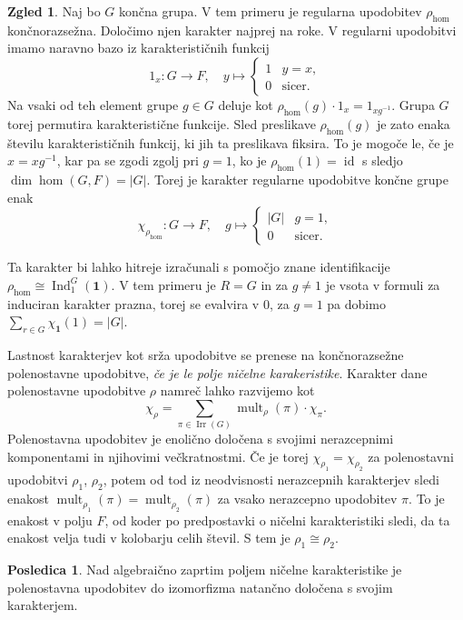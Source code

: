 \documentclass[11pt]{book}
\def\11{\mathbf{1}}
\DeclareMathOperator\Ind{Ind}
\DeclareMathOperator\mult{mult}
\DeclareMathOperator\Irr{Irr}
\DeclareMathOperator\id{id}
\theoremstyle{definition}
\theoremstyle{zgled}
\newtheorem*{zgled}{Zgled}
\theoremstyle{odprtproblem}
\theoremstyle{domacanaloga}
\theoremstyle{izrek}
\newtheorem*{posledica}{Posledica}
\begin{document}
\begin{zgled}
    Naj bo $G$ končna grupa. V tem primeru je regularna upodobitev $\rho_{\hom}$ končnorazsežna. Določimo njen karakter najprej na roke. V regularni upodobitvi imamo naravno bazo iz karakterističnih funkcij
    \[
        1_{x} \colon G \to F, \quad
        y \mapsto \begin{cases} 1 & y = x, \\ 0 & \text{sicer.} \end{cases}
    \]
    Na vsaki od teh element grupe $g \in G$ deluje kot $\rho_{\hom}(g) \cdot 1_x = 1_{x g^{-1}}$. Grupa $G$ torej permutira karakteristične funkcije. Sled preslikave $\rho_{\hom}(g)$ je zato enaka številu karakterističnih funkcij, ki jih ta preslikava fiksira. To je mogoče le, če je $x = x g^{-1}$, kar pa se zgodi zgolj pri $g = 1$, ko je $\rho_{\hom}(1) = \id$ s sledjo $\dim \hom(G,F) = |G|$. Torej je karakter regularne upodobitve končne grupe enak
    \[
        \chi_{\rho_{\hom}} \colon G \to F, \quad
        g \mapsto \begin{cases} |G| & g = 1, \\ 0 & \text{sicer.} \end{cases}
    \]
    
    Ta karakter bi lahko hitreje izračunali s pomočjo znane identifikacije $\rho_{\hom} \cong \Ind^G_1(\11)$. V tem primeru je $R = G$ in za $g \neq 1$ je vsota v formuli za induciran karakter prazna, torej se evalvira v $0$, za $g = 1$ pa dobimo $\sum_{r \in G} \chi_{\11}(1) = |G|$.
\end{zgled}

Lastnost karakterjev kot srža upodobitve se prenese na končnorazsežne polenostavne upodobitve, \emph{če je le polje ničelne karakeristike}. Karakter dane polenostavne upodobitve $\rho$ namreč lahko razvijemo kot
\[
    \displaystyle \chi_{\rho} = \sum_{\pi \in \Irr(G)} \mult_{\rho}(\pi) \cdot \chi_{\pi}.
\]
Polenostavna upodobitev je enolično določena s svojimi nerazcepnimi komponentami in njihovimi večkratnostmi. Če je torej $\chi_{\rho_1} = \chi_{\rho_2}$ za polenostavni upodobitvi $\rho_1$, $\rho_2$, potem od tod iz neodvisnosti nerazcepnih karakterjev sledi enakost $\mult_{\rho_1}(\pi) = \mult_{\rho_2}(\pi)$ za vsako nerazcepno upodobitev $\pi$. To je enakost v polju $F$, od koder po predpostavki o ničelni karakteristiki sledi, da ta enakost velja tudi v kolobarju celih števil. S tem je $\rho_1 \cong \rho_2$.

\begin{posledica}
Nad algebraično zaprtim poljem ničelne karakteristike je polenostavna upodobitev do izomorfizma natančno določena s svojim karakterjem.
\end{posledica}
\end{document}

